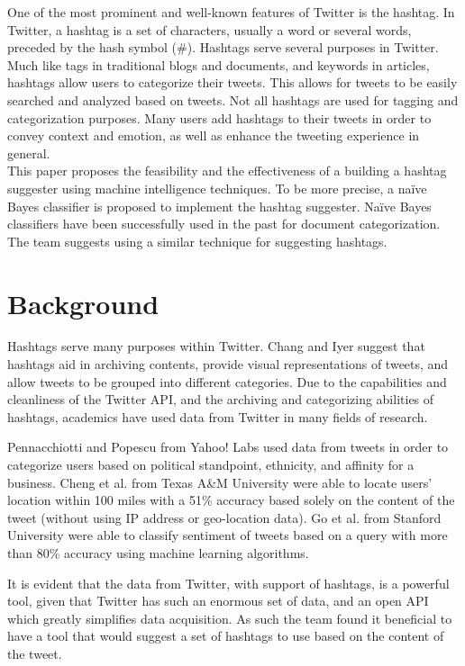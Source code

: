 \documentclass[conference]{IEEEtran}
\begin{document}
One of the most prominent and well-known features of Twitter is the hashtag. In Twitter, a hashtag is a set of characters, usually a word or several words, preceded by the hash symbol (\#). Hashtags serve several purposes in Twitter. Much like tags in traditional blogs and documents, and keywords in articles, hashtags allow users to categorize their tweets. This allows for tweets to be easily searched and analyzed based on tweets. Not all hashtags are used for tagging and categorization purposes. Many users add hashtags to their tweets in order to convey context and emotion, as well as enhance the tweeting experience in general. \\

This paper proposes the feasibility and the effectiveness of a building a hashtag suggester using machine intelligence techniques. To be more precise, a na\"{i}ve Bayes classifier is proposed to implement the hashtag suggester. Na\"{i}ve Bayes classifiers have been successfully used in the past for document categorization. The team suggests using a similar technique for suggesting hashtags.

\section{Background}
Hashtags serve many purposes within Twitter. Chang and Iyer \cite{chang} suggest that hashtags aid in archiving contents, provide visual representations of tweets, and allow tweets to be grouped into different categories. Due to the capabilities and cleanliness of the Twitter API, and the archiving and categorizing abilities of hashtags, academics have used data from Twitter in many fields of research.

Pennacchiotti and Popescu from Yahoo! Labs \cite{marco} used data from tweets in order to categorize users based on political standpoint, ethnicity, and affinity for a business. Cheng et al. from Texas A\&M University \cite{cheng} were able to locate users’ location within 100 miles with a 51\% accuracy based solely on the content of the tweet (without using IP address or geo-location data). Go et al. from Stanford University \cite{go} were able to classify sentiment of tweets based on a query with more than 80\% accuracy using machine learning algorithms.

It is evident that the data from Twitter, with support of hashtags, is a powerful tool, given that Twitter has such an enormous set of data, and an open API which greatly simplifies data acquisition. As such the team found it beneficial to have a tool that would suggest a set of hashtags to use based on the content of the tweet.
\end{document}
